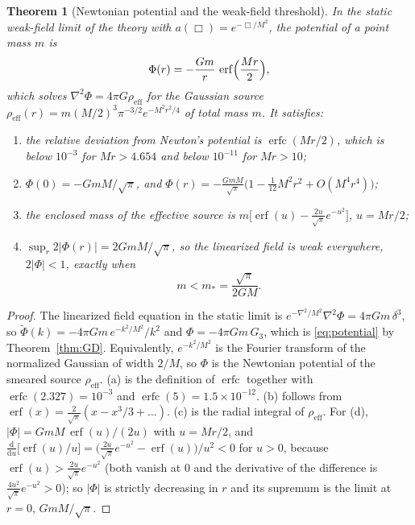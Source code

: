 \documentclass[aps,prd,10pt,twocolumn,superscriptaddress,nofootinbib,floatfix,longbibliography,showpacs,showkeys]{revtex4-2}
\theoremstyle{plain}
\newtheorem{theorem}{Theorem}
\theoremstyle{definition}
\theoremstyle{remark}
\newcommand{\erf}{\operatorname{erf}}
\newcommand{\erfc}{\operatorname{erfc}}
\newcommand{\dd}{\mathrm{d}}
\begin{document}
\begin{theorem}[Newtonian potential and the weak-field threshold]
\label{thm:potential}
In the static weak-field limit of the theory with $a(\Box)=e^{-\Box/M^2}$, the potential of a point mass $m$ is
\begin{equation}
\label{eq:potential}
\Phi(r)=-\frac{Gm}{r}\,\erf\Bigl(\frac{Mr}{2}\Bigr),
\end{equation}
which solves $\nabla^2\Phi=4\pi G\rho_{\mathrm{eff}}$ for the Gaussian source $\rho_{\mathrm{eff}}(r)=m(M/2)^3\pi^{-3/2}e^{-M^2r^2/4}$ of total mass $m$. It satisfies:
\begin{enumerate}[label=\textup{(\alph*)},leftmargin=2.2em,itemsep=0.1em]
\item the relative deviation from Newton's potential is $\erfc(Mr/2)$, which is below $10^{-3}$ for $Mr>4.654$ and below $10^{-11}$ for $Mr>10$;
\item $\Phi(0)=-GmM/\sqrt\pi$, and $\Phi(r)=-\frac{GmM}{\sqrt\pi}\bigl(1-\tfrac1{12}M^2r^2+O(M^4r^4)\bigr)$;
\item the enclosed mass of the effective source is $m\bigl[\erf(u)-\tfrac{2u}{\sqrt\pi}e^{-u^2}\bigr]$, $u=Mr/2$;
\item $\sup_r2|\Phi(r)|=2GmM/\sqrt\pi$, so the linearized field is weak everywhere, $2|\Phi|<1$, exactly when
\begin{equation}
\label{eq:threshold}
m<m_*=\frac{\sqrt\pi}{2GM} .
\end{equation}
\end{enumerate}
\end{theorem}

\begin{proof}
The linearized field equation in the static limit is $e^{-\nabla^2/M^2}\nabla^2\Phi=4\pi Gm\,\delta^3$, so $\widetilde\Phi(k)=-4\pi Gm\,e^{-k^2/M^2}/k^2$ and $\Phi=-4\pi Gm\,G_3$, which is \eqref{eq:potential} by Theorem~\ref{thm:GD}. Equivalently, $e^{-k^2/M^2}$ is the Fourier transform of the normalized Gaussian of width $2/M$, so $\Phi$ is the Newtonian potential of the smeared source $\rho_{\mathrm{eff}}$. (a) is the definition of $\erfc$ together with $\erfc(2.327)=10^{-3}$ and $\erfc(5)=1.5\times10^{-12}$. (b) follows from $\erf(x)=\frac{2}{\sqrt\pi}(x-x^3/3+\dots)$. (c) is the radial integral of $\rho_{\mathrm{eff}}$. For (d), $|\Phi|=GmM\,\erf(u)/(2u)$ with $u=Mr/2$, and $\frac{\dd}{\dd u}\bigl[\erf(u)/u\bigr]=\bigl(\tfrac{2u}{\sqrt\pi}e^{-u^2}-\erf(u)\bigr)/u^2<0$ for $u>0$, because $\erf(u)>\tfrac{2u}{\sqrt\pi}e^{-u^2}$ (both vanish at $0$ and the derivative of the difference is $\tfrac{4u^2}{\sqrt\pi}e^{-u^2}>0$); so $|\Phi|$ is strictly decreasing in $r$ and its supremum is the limit at $r=0$, $GmM/\sqrt\pi$.
\end{proof}
\end{document}
